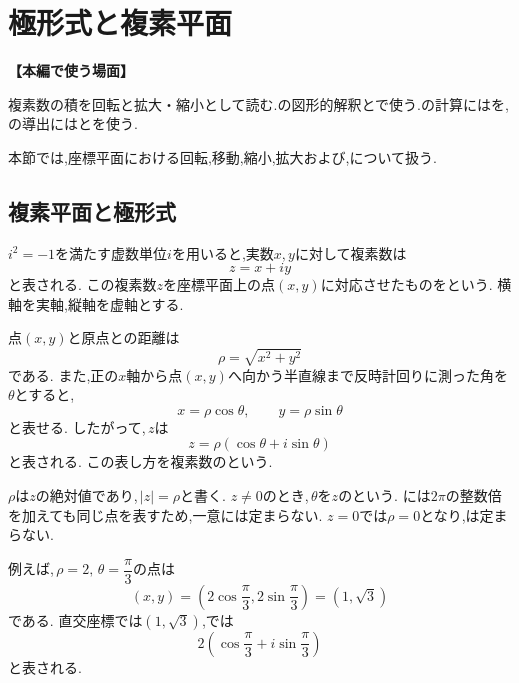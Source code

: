 
\section{極形式と複素平面}\label{節：極形式と複素平面}
  \noindent\textbf{【本編で使う場面】}\par
  複素数の積を回転と拡大・縮小として読む.の図形的解釈とで使う.の計算にはを,の導出にはとを使う.

本節では,座標平面における回転,移動,縮小,拡大および,について扱う.

  \subsection{複素平面と極形式}\label{節：複素平面と極形式}

    $i^2=-1$を満たす虚数単位$i$を用いると,実数$x,y$に対して複素数は
    \[
      z=x+iy
    \]
    と表される.
    この複素数$z$を座標平面上の点$(x,y)$に対応させたものをという.
    横軸を実軸,縦軸を虚軸とする.

    点$(x,y)$と原点との距離は
    \[
      \rho=\sqrt{x^2+y^2}
    \]
    である.
    また,正の$x$軸から点$(x,y)$へ向かう半直線まで反時計回りに測った角を$\theta$とすると,
    \[
      x=\rho\cos\theta,\qquad
      y=\rho\sin\theta
    \]
    と表せる.
    したがって,\,$z$は
    \[
      z=\rho(\cos\theta+i\sin\theta)
    \]
    と表される.
    この表し方を複素数のという.

    $\rho$は$z$の絶対値であり,\,$|z|=\rho$と書く.
    $z\ne0$のとき,\,$\theta$を$z$のという.
    には$2\pi$の整数倍を加えても同じ点を表すため,一意には定まらない.
    $z=0$では$\rho=0$となり,は定まらない.
  \BookFigPolar

    例えば,\,$\rho=2,\,\theta=\dfrac{\pi}{3}$の点は
    \[
      (x,y)
      =
      \left(
        2\cos\frac{\pi}{3},
        2\sin\frac{\pi}{3}
      \right)
      =
      (1,\sqrt{3})
    \]
    である.
    直交座標では$(1,\sqrt{3})$,では
    \[
      2\left(
        \cos\frac{\pi}{3}
        +i\sin\frac{\pi}{3}
      \right)
    \]
    と表される.


